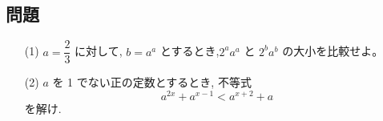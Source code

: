 \documentclass[8pt,dvipdfmx]{article}[b5paper]
\begin{document}
\begin{tcolorbox}[title=数学\textcircled{2} 1-4 BC]
\section*{問題}

\begin{itemize}
    \item[(1)] \( a = \dfrac{2}{3} \) に対して, \( b = a^a \) とするとき,\( 2^a a^a \) と \( 2^b a^b \) の大小を比較せよ。
    \item[(2)] \( a \)  を 1 でない正の定数とするとき, 不等式
    \[
    a^{2x} + a^{x-1} < a^{x+2} + a
    \]
    を解け.
\end{itemize}
\end{tcolorbox}


\end{document}
